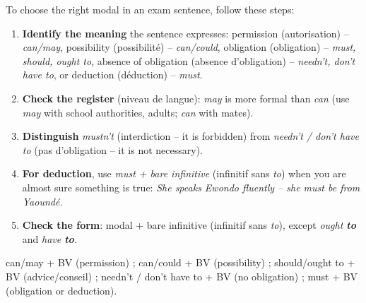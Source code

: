 \documentclass[11pt]{article}
\newcommand{\cle}[1]{{\popxbold\color{popdark}#1}}
\begin{document}
\begin{methode}
To choose the right modal in an exam sentence, follow these steps:
\begin{enumerate}
\item \textbf{Identify the meaning} the sentence expresses: \cle{permission} (autorisation) -- \emph{can/may}, \cle{possibility} (possibilité) -- \emph{can/could}, \cle{obligation} (obligation) -- \emph{must, should, ought to}, \cle{absence of obligation} (absence d'obligation) -- \emph{needn't, don't have to}, or \cle{deduction} (déduction) -- \emph{must}.
\item \textbf{Check the register} (niveau de langue): \emph{may} is more formal than \emph{can} (use \emph{may} with school authorities, adults; \emph{can} with mates).
\item \textbf{Distinguish} \emph{mustn't} (interdiction -- it is forbidden) from \emph{needn't / don't have to} (pas d'obligation -- it is not necessary).
\item \textbf{For deduction}, use \emph{must + bare infinitive} (infinitif sans \emph{to}) when you are almost sure something is true: \emph{She speaks Ewondo fluently -- she must be from Yaoundé.}
\item \textbf{Check the form}: modal + \cle{bare infinitive} (infinitif sans \emph{to}), except \emph{ought \textbf{to}} and \emph{have \textbf{to}}.
\end{enumerate}
\begin{aretenir}
can/may + BV (permission) ; can/could + BV (possibility) ; should/ought to + BV (advice/conseil) ; needn't / don't have to + BV (no obligation) ; must + BV (obligation or deduction).
\end{aretenir}
\end{methode}
\end{document}
